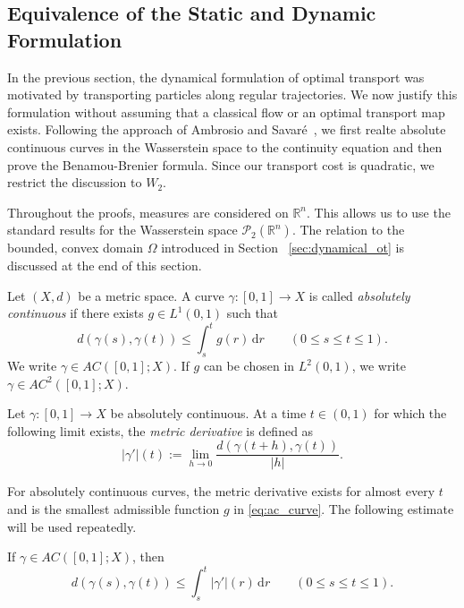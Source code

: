 \subsection{Equivalence of the Static and Dynamic Formulation}
In the previous section, the dynamical formulation of optimal transport was motivated by transporting particles along regular trajectories. We now justify this formulation without assuming that a classical flow or an optimal transport map exists. Following the approach of Ambrosio and Savar\'e~\cite{AmbrosioSavare2007}, we first realte absolute continuous curves in the Wasserstein space to the continuity equation and then prove the Benamou-Brenier formula. Since our transport cost is quadratic, we restrict the discussion to $W_2$.

Throughout the proofs, measures are considered on $\mathbb{R}^n$. This allows us to use the standard results for the Wasserstein space $\mathscr{P}_2(\mathbb{R}^n)$. The relation to the bounded, convex domain $\Omega$ introduced in Section ~\ref{sec:dynamical_ot} is discussed at the end of this section.
\begin{definition}
	Let $(X,d)$ be a metric space. A curve $\gamma:[0,1]\to X$ is called \emph{absolutely continuous} if there exists $g\in L^1(0,1)$ such that 
	\begin{equation*}
		d(\gamma(s),\gamma(t))\leq\int_s^t g(r)\,\mathrm{d}r\qquad (0\leq s\leq t\leq 1).\label{eq:ac_curve}
	\end{equation*}
	We write $\gamma\in AC([0,1];X)$. If $g$ can be chosen in $L^2(0,1)$, we write $\gamma\in AC^2([0,1];X)$.
\end{definition}
\begin{definition}
	Let $\gamma:[0,1]\to X$ be absolutely continuous. At a time $t\in(0,1)$ for which the following limit exists, the \emph{metric derivative} is defined as 
	\begin{equation*}
		|\gamma'|(t) := \lim_{h\to0}\frac{d(\gamma(t+h),\gamma(t))}{|h|}.\label{eq:metric_derivative}
	\end{equation*}	
\end{definition}

For absolutely continuous curves, the metric derivative exists for almost every $t$ and is the smallest admissible function $g$ in \eqref{eq:ac_curve}. The following estimate will be used repeatedly.

\begin{lemma}
	\label{lem:metric_length}
	If $\gamma\in AC([0,1];X)$, then 
	\begin{equation*}
		d(\gamma(s),\gamma(t))\leq \int_s^t|\gamma'|(r)\,\mathrm{d}r\qquad (0\leq s \leq t \leq 1).\label{eq:metric_bound}
	\end{equation*}
\end{lemma}

